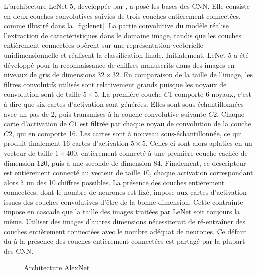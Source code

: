 L'architecture LeNet-5, developpée par \citet{lecun_gradient-based_1998}, a posé les bases des \gls{CNN}. Elle consiste en deux couches convolutives suivies de trois couches entièrement connectées, comme illustré dans la~\cref{fig:lenet}. La partie convolutive du modèle réalise l'extraction de caractéristiques dans le domaine image, tandis que les couches entièrement connectées opèrent sur une représentation vectorielle unidimensionnelle et réalisent la classification finale. Initialement, LeNet-5 a été développé pour la reconnaissance de chiffres manuscrits dans des images en niveaux de gris de dimensions $32\times32$. En comparaison de la taille de l'image, les filtres convolutifs utilisés sont relativement grands puisque les noyaux de convolution sont de taille $5\times5$. La première couche $C1$ comporte 6 noyaux, c'est-à-dire que six cartes d'activation sont générées. Elles sont sous-échantillonnées avec un pas de 2, puis transmises à la couche convolutive suivante $C2$. Chaque carte d'activation de $C1$ est filtrée par chaque noyau de convolution de la couche $C2$, qui en comporte 16. Les cartes sont à nouveau sous-échantillonnée, ce qui produit finalement 16 cartes d'activation $5\times5$. Celles-ci sont alors aplaties en un vecteur de taille $1\times400$, entièrement connecté à une première couche cachée de dimension $120$, puis à une seconde de dimension $84$. Finalement, ce descripteur est entièrement connecté au vecteur de taille $10$, chaque activation correspondant alors à un des 10 chiffres possibles. La présence des couches entièrement connectées, dont le nombre de neurones est fixé, impose aux cartes d'activation issues des couches convolutives d'être de la bonne dimension. Cette contrainte impose en cascade que la taille des images traitées par LeNet soit toujours la même. Utiliser des images d'autres dimensions nécessiterait de ré-entraîner des couches entièrement connectées avec le nombre adéquat de neurones. Ce défaut du à la présence des couches entièrement connectées est partagé par la plupart des \gls{CNN}.

\begin{figure}[t]
  \resizebox{\textwidth}{!}{
    
  }
  \caption{Architecture AlexNet~\cite{krizhevsky_imagenet_2012}}
  \label{fig:alexnet}
\end{figure}

